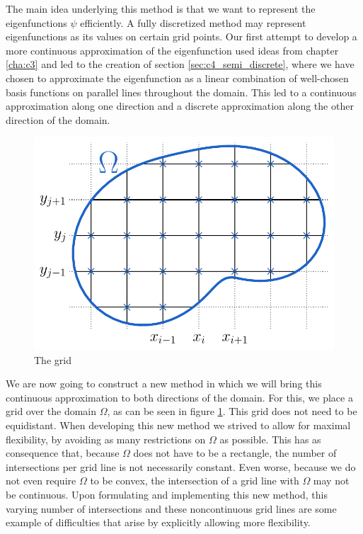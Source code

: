 The main idea underlying this method is that we want to represent the eigenfunctions $\psi$ efficiently. A fully discretized method may represent eigenfunctions as its values on certain grid points. Our first attempt to develop a more continuous approximation of the eigenfunction used ideas from chapter \ref{cha:c3} and led to the creation of section \ref{sec:c4_semi_discrete}, where we have chosen to approximate the eigenfunction as a linear combination of well-chosen basis functions on parallel lines throughout the domain. This led to a continuous approximation along one direction and a discrete approximation along the other direction of the domain.

\begin{figure}
    \begin{center}
        \includegraphics[width=.66\linewidth]{img/chapter4/the_method_grid.pdf}
        \caption{\label{fig:woven_method_grid} The grid}
    \end{center}
\end{figure}

We are now going to construct a new method in which we will bring this continuous approximation to both directions of the domain. For this, we place a grid over the domain $\Omega$, as can be seen in figure \ref{fig:woven_method_grid}. This grid does not need to be equidistant. When developing this new method we strived to allow for maximal flexibility, by avoiding as many restrictions on $\Omega$ as possible. This has as consequence that, because $\Omega$ does not have to be a rectangle, the number of intersections per grid line is not necessarily constant. Even worse, because we do not even require $\Omega$ to be convex, the intersection of a grid line with $\Omega$ may not be continuous. Upon formulating and implementing this new method, this varying number of intersections and these noncontinuous grid lines are some example of difficulties that arise by explicitly allowing more flexibility.

